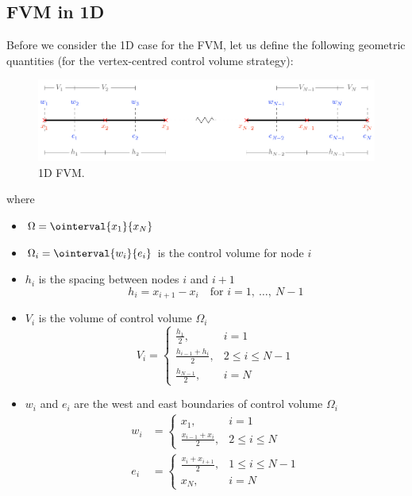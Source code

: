 \documentclass{article}
\begin{document}
\subsection{FVM in 1D}
Before we consider the 1D case for the FVM, let us define the following
geometric quantities (for the vertex-centred control volume strategy):
\begin{figure}[H]
    \centering
    \includegraphics[width = \linewidth]{figures/1d-fvm.pdf}
    \caption{1D FVM.} %
\end{figure}
where
\begin{itemize}
    \item \(\Omega = \ointerval{x_1}{x_N}\)
    \item \(\Omega_i = \ointerval{w_i}{e_i}\) is the control volume for node \(i\)
    \item \(h_i\) is the spacing between nodes \(i\) and \(i + 1\)
          \begin{equation*}
              h_i = x_{i+1} - x_i \quad \text{for \(i = 1,\: \ldots,\: N-1\)}
          \end{equation*}
    \item \(V_i\) is the volume of control volume \(\Omega_i\)
          \begin{equation*}
              V_i =
              \begin{cases}
                  \displaystyle \frac{h_1}{2},           & i = 1                       \\
                  \displaystyle \frac{h_{i-1} + h_i}{2}, & 2 \leqslant i \leqslant N-1 \\
                  \displaystyle \frac{h_{N-1}}{2},       & i = N
              \end{cases}
          \end{equation*}
    \item \(w_i\) and \(e_i\) are the west and east boundaries of
          control volume \(\Omega_i\)
          \begin{align*}
              w_i & =
              \begin{cases}
                  \displaystyle x_1,                     & i = 1                     \\
                  \displaystyle \frac{x_{i-1} + x_i}{2}, & 2 \leqslant i \leqslant N
              \end{cases}
              \\
              e_i & =
              \begin{cases}
                  \displaystyle \frac{x_i + x_{i+1}}{2}, & 1 \leqslant i \leqslant N-1 \\
                  \displaystyle x_N,                     & i = N
              \end{cases}
          \end{align*}
\end{itemize}
\end{document}

